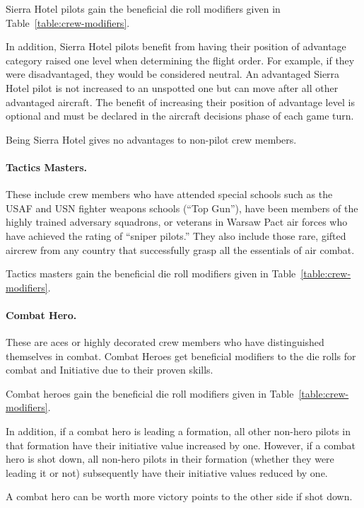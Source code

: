 \begin{advancedrules}
{Sierra Hotel pilots gain the beneficial die roll modifiers given in Table~\ref{table:crew-modifiers}.

In addition, Sierra Hotel pilots benefit from having their position of advantage category raised one level when determining the flight order. For example, if they were disadvantaged, they would be considered neutral. An advantaged Sierra Hotel pilot is not increased to an unspotted one but can move after all other advantaged aircraft. The benefit of increasing their position of advantage level is optional and must be declared in the aircraft decisions phase of each game turn.

Being Sierra Hotel gives no advantages to non-pilot crew members.

\paragraph{Tactics Masters.} These include crew members who have attended special schools such as the USAF and USN fighter weapons schools (“Top Gun”), have been members of the highly trained adversary squadrons, or veterans in Warsaw Pact air forces who have achieved the rating of “sniper pilots.” They also include those rare, gifted aircrew from any country that successfully grasp all the essentials of air combat.

Tactics masters gain the beneficial die roll modifiers given in Table~\ref{table:crew-modifiers}.

\paragraph{Combat Hero.} These are aces or highly decorated crew members who have distinguished themselves in combat. Combat Heroes get beneficial modifiers to the die rolls for combat and Initiative due to their proven skills.

Combat heroes gain the beneficial die roll modifiers given in Table~\ref{table:crew-modifiers}.

In addition, if a combat hero is leading a formation, all other non-hero pilots in that formation have their initiative value increased by one. However, if a combat hero is shot down, all non-hero pilots in their formation (whether they were leading it or not) subsequently have their initiative values reduced by one.

A combat hero can be worth more victory points to the other side if shot down. 

}


\end{advancedrules}
